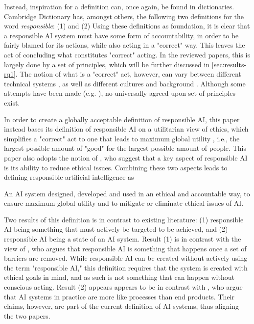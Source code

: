 Instead, inspiration for a definition can, once again, be found in dictionaries. Cambridge Dictionary \parencite{dictionary_responsible} has, amongst others, the following two definitions for the word \textit{responsible}: (1)  and (2)  Using these definitions as foundation, it is clear that a responsible AI system must have some form of accountability, in order to be fairly blamed for its actions, while also acting in a "correct" way. This leaves the act of concluding what constitutes "correct" acting. In the reviewed papers, this is largely done by a set of principles, which will be further discussed in \autoref{sec:results-rq1}. The notion of what is a "correct" act, however, can vary between different technical systems \parencite{Hagendorff_2020}, as well as different cultures and background \parencite{Ford_1994}. Although some attempts have been made (e.g. \cite{Jobin_2019,Hagendorff_2020}), no universally agreed-upon set of principles exist.

In order to create a globally acceptable definition of responsible AI, this paper instead bases its definition of responsible AI on a utilitarian view of ethics, which simplifies a "correct" act to one that leads to maximum global utility \parencite{Lang_2004}, i.e., the largest possible amount of "good" for the largest possible amount of people. This paper also adopts the notion of \parencite{Trocin_2021}, who suggest that a key aspect of responsible AI is its ability to reduce ethical issues. Combining these two aspects leads to defining responsible artificial intelligence as
\begin{displayquote}
    An AI system designed, developed and used in an ethical and accountable way, to ensure maximum global utility and to mitigate or eliminate ethical issues of AI.
\end{displayquote}

Two results of this definition is in contrast to existing literature: (1) responsible AI being something that must actively be targeted to be achieved, and (2) responsible AI being a state of an AI system. Result (1) is in contrast with the view of \textcite{Merhi_2022}, who argues that responsible AI is something that happens once a set of barriers are removed. While responsible AI can be created without actively using the term "responsible AI," this definition requires that the system is created with ethical goals in mind, and as such is not something that can happen without conscious acting. Result (2) appears appears to be in contrast with \textcite{Ahmad_2021}, who argue that AI systems in practice are more like processes than end products. Their claims, however, are part of the current definition of AI systems, thus aligning the two papers.

